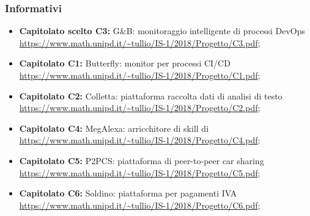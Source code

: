 		\subsubsection{Informativi}
		\begin{itemize}
			\item \textbf{Capitolato scelto C3:} G\&B: monitoraggio intelligente di processi DevOps \\ 
			\url{https://www.math.unipd.it/~tullio/IS-1/2018/Progetto/C3.pdf};
 			\item \textbf{Capitolato  C1:} Butterfly: monitor per processi CI/CD \\ \url{https://www.math.unipd.it/~tullio/IS-1/2018/Progetto/C1.pdf};
 			\item \textbf{Capitolato C2:} Colletta: piattaforma raccolta dati di analisi di testo \\ 
 			\url{https://www.math.unipd.it/~tullio/IS-1/2018/Progetto/C2.pdf};
 			\item \textbf{Capitolato C4:} MegAlexa: arricchitore di skill di  \\ \url{https://www.math.unipd.it/~tullio/IS-1/2018/Progetto/C4.pdf};
 			\item \textbf{Capitolato C5:} P2PCS: piattaforma di peer-to-peer car sharing \\ \url{https://www.math.unipd.it/~tullio/IS-1/2018/Progetto/C5.pdf};
 			\item \textbf{Capitolato C6:} Soldino: piattaforma  per pagamenti IVA \\ \url{https://www.math.unipd.it/~tullio/IS-1/2018/Progetto/C6.pdf};
 			
		\end{itemize}
	\pagebreak
		


